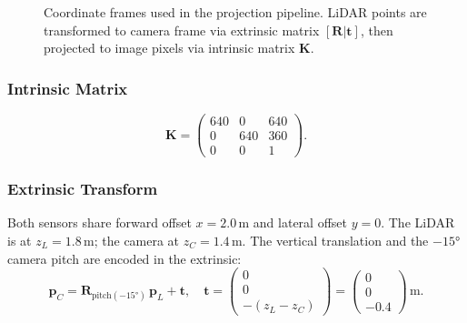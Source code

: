 \documentclass[12pt,a4paper]{article}
\begin{document}
\begin{figure}[H]
\caption{Coordinate frames used in the projection pipeline.  LiDAR points
  are transformed to camera frame via extrinsic matrix $[\mathbf{R}|\mathbf{t}]$,
  then projected to image pixels via intrinsic matrix $\mathbf{K}$.}
\label{fig:coord_frames}
\end{figure}

\subsubsection{Intrinsic Matrix}

\begin{equation}
  \mathbf{K} = \begin{pmatrix}
    640 & 0   & 640 \\
    0   & 640 & 360 \\
    0   & 0   & 1
  \end{pmatrix}.
  \label{eq:intrinsic}
\end{equation}

\subsubsection{Extrinsic Transform}

Both sensors share forward offset $x = 2.0$\,m and lateral offset $y = 0$.
The LiDAR is at $z_L = 1.8$\,m; the camera at $z_C = 1.4$\,m.  The vertical
translation and the $-15°$ camera pitch are encoded in the extrinsic:
\begin{equation}
  \mathbf{p}_C = \mathbf{R}_{\text{pitch}(-15°)}\,\mathbf{p}_L + \mathbf{t},
  \quad
  \mathbf{t} = \begin{pmatrix}0\\0\\-(z_L - z_C)\end{pmatrix}
             = \begin{pmatrix}0\\0\\-0.4\end{pmatrix}\,\text{m}.
  \label{eq:extrinsic}
\end{equation}
\end{document}
